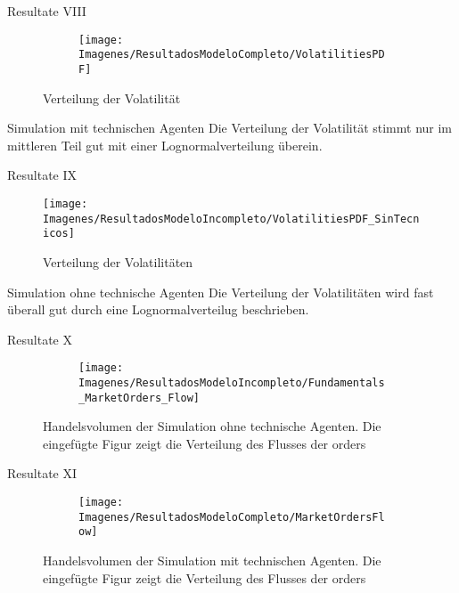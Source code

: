 \documentclass{beamer}
\begin{document}
	\begin{frame}{Resultate VIII}
		\begin{figure}[!h]
			\centering
			\begin{subfigure}[b]{0.7\textwidth}
				\texttt{[image: Imagenes/ResultadosModeloCompleto/VolatilitiesPDF]}
			\end{subfigure}
			\caption{Verteilung der Volatilität}
		\end{figure}
		\begin{block}{Simulation mit technischen Agenten}
			Die Verteilung der Volatilität stimmt nur im mittleren Teil gut mit einer Lognormalverteilung überein.
		\end{block}
	\end{frame}

	\begin{frame}{Resultate IX}
		\begin{figure}[!h]
			\centering
			\texttt{[image: Imagenes/ResultadosModeloIncompleto/VolatilitiesPDF\_SinTecnicos]}
			\caption{Verteilung der Volatilitäten}
		\end{figure}
		\begin{block}{Simulation ohne technische Agenten}
			Die Verteilung der Volatilitäten wird fast überall gut durch eine Lognormalverteilug beschrieben.
		\end{block}
	\end{frame}

	\begin{frame}{Resultate X}
		\begin{figure}[!h]
			\centering
			\begin{subfigure}[b]{0.7\textwidth}
				\texttt{[image: Imagenes/ResultadosModeloIncompleto/Fundamentals\_MarketOrders\_Flow]}
			\end{subfigure}	
			\caption{Handelsvolumen der Simulation ohne technische Agenten. Die eingefügte Figur zeigt die Verteilung des Flusses der orders}
		\end{figure}
	\end{frame}

	\begin{frame}{Resultate XI}
		\begin{figure}
			\begin{subfigure}[b]{0.7\textwidth}
				\texttt{[image: Imagenes/ResultadosModeloCompleto/MarketOrdersFlow]}	
			\end{subfigure}
			\caption{Handelsvolumen der Simulation mit technischen Agenten. Die eingefügte Figur zeigt die Verteilung des Flusses der orders}	
		\end{figure}
	\end{frame}
\end{document}
